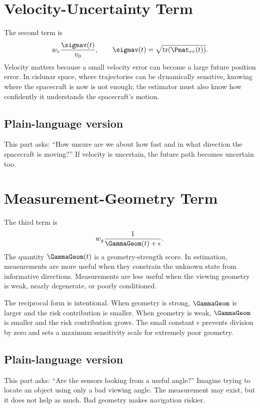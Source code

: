 \documentclass[11pt]{article}
\begin{document}
\section{Velocity-Uncertainty Term}

The second term is
\begin{equation}
  w_v \frac{\sigmav(t)}{v_0},
  \qquad
  \sigmav(t)=\sqrt{\mathrm{tr}(\Pmat_{vv}(t))}.
\end{equation}
Velocity matters because a small velocity error can become a large future
position error. In cislunar space, where trajectories can be dynamically
sensitive, knowing where the spacecraft is now is not enough; the estimator
must also know how confidently it understands the spacecraft's motion.

\subsection*{Plain-language version}

This part asks: ``How unsure are we about how fast and in what direction the
spacecraft is moving?'' If velocity is uncertain, the future path becomes
uncertain too.

\section{Measurement-Geometry Term}

The third term is
\begin{equation}
  w_g \frac{1}{\GammaGeom(t)+\epsilon}.
\end{equation}
The quantity $\GammaGeom(t)$ is a geometry-strength score. In estimation,
measurements are more useful when they constrain the unknown state from
informative directions. Measurements are less useful when the viewing geometry
is weak, nearly degenerate, or poorly conditioned.

The reciprocal form is intentional. When geometry is strong, $\GammaGeom$ is
larger and the risk contribution is smaller. When geometry is weak,
$\GammaGeom$ is smaller and the risk contribution grows. The small constant
$\epsilon$ prevents division by zero and sets a maximum sensitivity scale for
extremely poor geometry.

\subsection*{Plain-language version}

This part asks: ``Are the sensors looking from a useful angle?'' Imagine trying
to locate an object using only a bad viewing angle. The measurement may exist,
but it does not help as much. Bad geometry makes navigation riskier.
\end{document}
